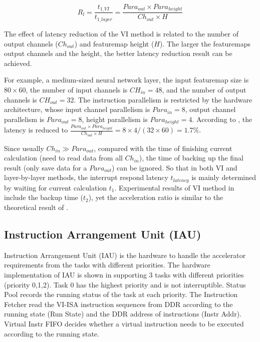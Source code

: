 \begin{equation}
	R_l = \frac{ t_{1\_VI} }{ t_{1\_layer} } = \frac{ Para_{out} \times Para_{height} }{ Ch_{out} \times H} 
	\label{equ:rate}
\end{equation}

The effect of latency reduction of the VI method is related to the number of output channels ($Ch_{out}$) and featuremap height ($H$). The larger the featuremaps output channels and the height, the better latency reduction result can be achieved.

For example, a medium-sized neural network layer, the input featuremap size is $80 \times 60$, the number of input channels is $CH_{in} = 48$, and the number of output channels is $CH_{out} = 32$. The instruction parallelism is restricted by the hardware architecture, whose input channel parallelism is $Para_{in} = 8$, output channel parallelism is $Para_{out} = 8$, height parallelism is $Para_{height} = 4$.
According to , the latency is reduced to $\frac{ Para_{out} \times Para_{height} }{ Ch_{out} \times H} = 8 \times 4 / (32 \times 60) = 1.7\%$.

Since usually $Ch_{in} \gg Para_{out}$, compared with the time of finishing current calculation (need to read data from all $Ch_{in}$), the time of backing up the final result (only save data for a $Para_{out}$) can be ignored. So that in both VI and layer-by-layer methods, the interrupt respond latency $t_{latency}$ is mainly determined by waiting for current calculation $t_{1}$. Experimental results of VI method in  include the backup time ($t_2$), yet the acceleration ratio is similar to the theoretical result of .


\subsection{ Instruction Arrangement Unit (IAU) }

Instruction Arrangement Unit (IAU) is the hardware to handle the accelerator requirements from the tasks with different priorities. 
The hardware implementation of IAU is shown in  supporting 3 tasks with different priorities (priority 0,1,2).
Task 0 has the highest priority and is not interruptible.
Status Pool records the running status of the task at each priority. The Instruction Fetcher read the VI-ISA instruction sequences from DDR according to the running state (Run State) and the DDR address of instructions (Instr Addr). Virtual Instr FIFO decides whether a virtual instruction needs to be executed according to the running state.

